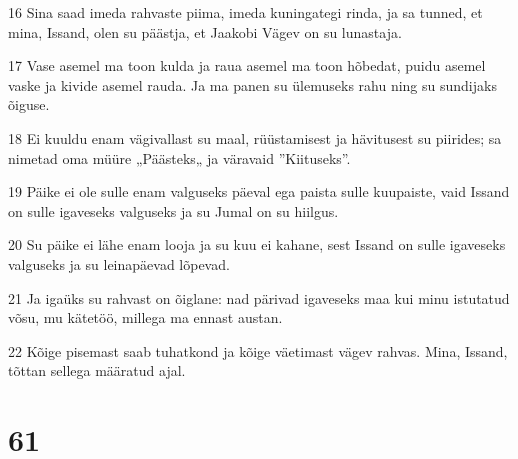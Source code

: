 \par 16 Sina saad imeda rahvaste piima, imeda kuningategi rinda, ja sa tunned, et mina, Issand, olen su päästja, et Jaakobi Vägev on su lunastaja.
\par 17 Vase asemel ma toon kulda ja raua asemel ma toon hõbedat, puidu asemel vaske ja kivide asemel rauda. Ja ma panen su ülemuseks rahu ning su sundijaks õiguse.
\par 18 Ei kuuldu enam vägivallast su maal, rüüstamisest ja hävitusest su piirides; sa nimetad oma müüre „Päästeks„ ja väravaid ”Kiituseks”.
\par 19 Päike ei ole sulle enam valguseks päeval ega paista sulle kuupaiste, vaid Issand on sulle igaveseks valguseks ja su Jumal on su hiilgus.
\par 20 Su päike ei lähe enam looja ja su kuu ei kahane, sest Issand on sulle igaveseks valguseks ja su leinapäevad lõpevad.
\par 21 Ja igaüks su rahvast on õiglane: nad pärivad igaveseks maa kui minu istutatud võsu, mu kätetöö, millega ma ennast austan.
\par 22 Kõige pisemast saab tuhatkond ja kõige väetimast vägev rahvas. Mina, Issand, tõttan sellega määratud ajal.

\chapter{61}

